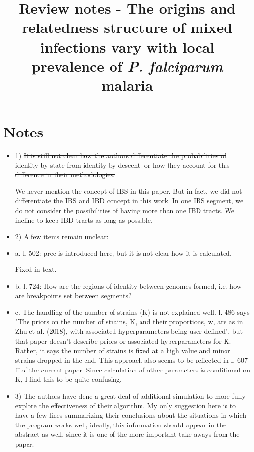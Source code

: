 \documentclass[11pt,twoside,a4paper]{article}
\begin{document}
\title{Review notes - The origins and relatedness structure of mixed infections vary with local prevalence of {\it P. falciparum} malaria}
\newcommand\shorttitle{Review}
\date{}
\maketitle{}
\section{Notes}

\begin{itemize}

    \item 1) \st{It is still not clear how the authors differentiate the probabilities of identity-by-state from identity-by-descent, or how they account for this difference in their methodologies.}

We never mention the concept of IBS in this paper. But in fact, we did not differentiate the IBS and IBD concept in this work. In one IBS segment, we do not consider the possibilities of having more than one IBD tracts. We incline to keep IBD tracts as long as possible.

    \item 2) A few items remain unclear:

    \item a. \st{l. 502: prec is introduced here, but it is not clear how it is calculated.}

Fixed in text.

    \item b. l. 724: How are the regions of identity between genomes formed, i.e. how are breakpoints set between segments?

    \item c. The handling of the number of strains (K) is not explained well. l. 486 says "The priors on the number of strains, K, and their proportions, w, are as in Zhu et al. (2018), with associated hyperparameters being user-defined", but that paper doesn't describe priors or associated hyperparameters for K. Rather, it says the number of strains is fixed at a high value and minor strains dropped in the end. This approach also seems to be reflected in l. 607 ff of the current paper. Since calculation of other parameters is conditional on K, I find this to be quite confusing.

    \item 3) The authors have done a great deal of additional simulation to more fully explore the effectiveness of their algorithm. My only suggestion here is to have a few lines summarizing their conclusions about the situations in which the program works well; ideally, this information should appear in the abstract as well, since it is one of the more important take-aways from the paper.


\end{itemize}
\end{document}
